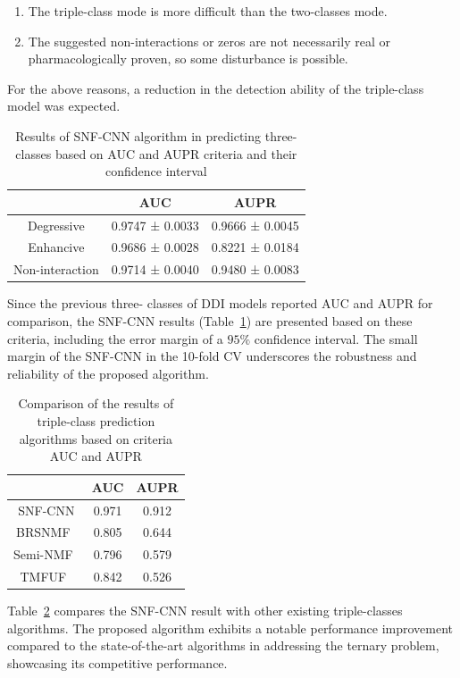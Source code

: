 \documentclass[unnumsec,webpdf,contemporary,large]{oup-authoring-template}%
\theoremstyle{thmstyleone}%
\theoremstyle{thmstyletwo}%
\theoremstyle{thmstylethree}%
\begin{document}
\begin{enumerate}
    \item The triple-class mode is more difficult than the two-classes mode.
    \item The suggested non-interactions or zeros are not necessarily real or pharmacologically proven, so some disturbance is possible.
\end{enumerate}
For the above reasons, a reduction in the detection ability of the triple-class model was expected.
\begin{table}[]
    \centering
    \begin{tabular}{|c|c|c|}
    \hline
         &AUC&AUPR\\\hline
Degressive&0.9747 ± 0.0033&0.9666 ± 0.0045\\
Enhancive&0.9686 ± 0.0028&0.8221 ± 0.0184\\
Non-interaction&0.9714 ± 0.0040&0.9480 ± 0.0083\\\hline
    \end{tabular}
    \caption{Results of SNF-CNN algorithm in predicting three- classes based on AUC and AUPR criteria and their confidence interval}
    \label{tab6}
\end{table}
Since the previous three- classes of DDI models reported AUC and AUPR for comparison, the SNF-CNN results (Table~\ref{tab6}) are presented based on these criteria, including the error margin of a $95\%$ confidence interval. The small margin of the SNF-CNN in the 10-fold CV underscores the robustness and reliability of the proposed algorithm. 
\begin{table}[]
    \centering
    \begin{tabular}{|c|c|c|}
         \hline
&AUC&AUPR\\\hline
SNF-CNN&0.971&0.912\\
BRSNMF~\cite{Shi2019}&0.805&0.644\\
Semi-NMF~\cite{lesly2018} &0.796&0.579\\
TMFUF~\cite{Shi2018}&0.842&0.526\\\hline
    \end{tabular}
    \caption{Comparison of the results of triple-class prediction algorithms based on criteria AUC and AUPR}
    \label{tab7}
\end{table}
Table~\ref{tab7} compares the SNF-CNN result with other existing triple-classes algorithms. The proposed algorithm exhibits a notable performance improvement compared to the state-of-the-art algorithms in addressing the ternary problem, showcasing its competitive performance.
\end{document}
